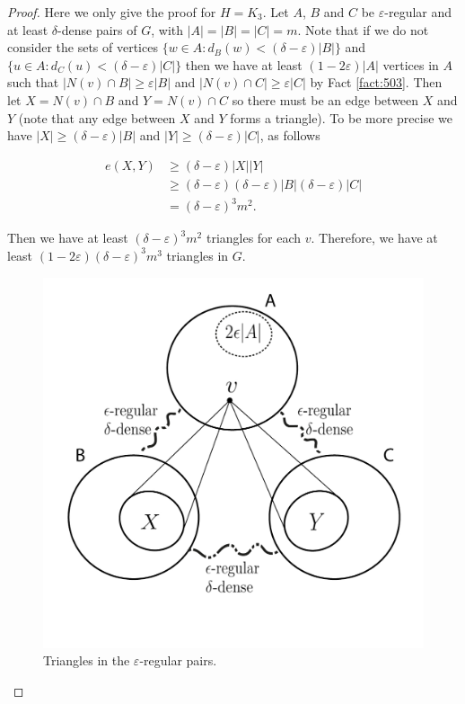 \documentclass[12pt,twoside,a4paper,bibliography=totocnumbered]{book}
\numberwithin{equation}{section}
\theoremstyle{remark}
\begin{document}
\begin{proof}
Here we only give the proof for $H=K_3$. Let %
 $A$, $B$ and $C$ be $\varepsilon$-regular and at least $\delta$-dense pairs of $G$, with $|A|=|B|=|C|=m$. Note that if we do not consider the sets of vertices $\{w\in A \colon d_B(w) < (\delta - \varepsilon)|B| \}$  and $\{u\in A \colon d_C(u) < (\delta - \varepsilon)|C| \}$ then we have at least $(1-2\varepsilon)|A|$ vertices in $A$ such that $|N(v) \cap B| \geq \varepsilon |B|$ and $|N(v) \cap C| \geq \varepsilon |C|$ by Fact \ref{fact:503}. Then let $X = N(v) \cap B$ and $Y =N(v) \cap C$ so there must be an edge between $X$ and $Y$ (note that any edge between $X$ and $Y$ forms a triangle). To be more precise we have $|X| \geq (\delta - \varepsilon)|B|$ and $|Y| \geq (\delta - \varepsilon)|C|$, as follows

\begin{align*}
e(X,Y) &\geq (\delta - \varepsilon)|X||Y|\\
& \geq (\delta - \varepsilon)  (\delta - \varepsilon)|B|  (\delta - \varepsilon)|C|\\
& =  (\delta - \varepsilon)^3 m^2.
\end{align*}

Then we have at least $ (\delta - \varepsilon)^3 m^2$ triangles for each $v$. Therefore, we have at least $(1-2\varepsilon) (\delta-\varepsilon)^3 m^3$ triangles in $G$. 

\begin{figure}[H]
     \centering
     \includegraphics[scale=1]{Figuras/embedding-lemma.jpg}
     \caption{Triangles in the $\varepsilon$-regular pairs.}
     \label{fig:embeddinglemma}
\end{figure}

\end{proof}
\end{document}

